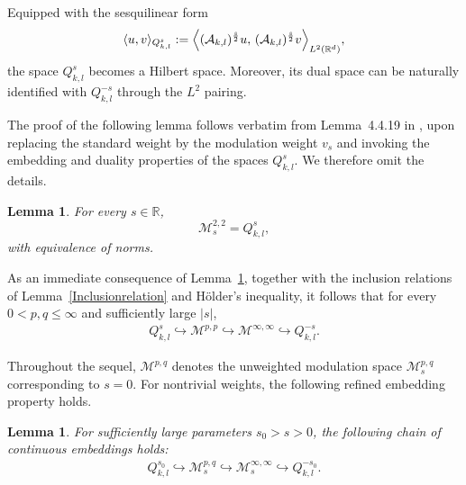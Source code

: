 \documentclass[12pt,reqno,a4paper]{amsart}
\numberwithin{equation}{section}
\theoremstyle{plain}
\newtheorem{lemma}[theorem]{Lemma}
\theoremstyle{definition}
\theoremstyle{remark}
\begin{document}
Equipped with the sesquilinear form
\begin{align*}
\langle u,v\rangle_{Q^{s}_{k,l}}
:=
\Bigl\langle
(\mathcal{A}_{k,l})^{\frac{s}{2}}u,\,
(\mathcal{A}_{k,l})^{\frac{s}{2}}v
\Bigr\rangle_{L^{2}(\mathbb{R}^{d})},
\end{align*}
the space $Q^{s}_{k,l}$ becomes a Hilbert space. Moreover, its dual space can be naturally identified with $Q^{-s}_{k,l}$ through the $L^{2}$ pairing.

The proof of the following lemma follows verbatim from Lemma~4.4.19 in \cite{MR4201879}, upon replacing the standard weight by the modulation weight $v_s$ and invoking the embedding and duality properties of the spaces $Q^{s}_{k,l}$. We therefore omit the details.

\begin{lemma}
\label{anharmonicsobolevspace}
For every $s\in\mathbb{R}$,
\[
\mathcal{M}^{2,2}_{s}
=
Q^{s}_{k,l},
\]
with equivalence of norms.
\end{lemma}

As an immediate consequence of Lemma~\ref{anharmonicsobolevspace}, together with the inclusion relations of Lemma~\ref{Inclusionrelation} and Hölder's inequality, it follows that for every $0<p,q\leq \infty$ and sufficiently large $|s|$,
\begin{align*}
Q^{s}_{k,l}
\hookrightarrow
\mathcal{M}^{p,p}
\hookrightarrow
\mathcal{M}^{\infty,\infty}
\hookrightarrow
Q^{-s}_{k,l}.
\end{align*}

Throughout the sequel, $\mathcal{M}^{p,q}$ denotes the unweighted modulation space $\mathcal{M}^{p,q}_{s}$ corresponding to $s=0$. For nontrivial weights, the following refined embedding property holds.

\begin{lemma}
For sufficiently large parameters $s_{0}>s>0$, the following chain of continuous embeddings holds:
\begin{align}
\label{chain1}
Q^{s_{0}}_{k,l}
\hookrightarrow
\mathcal{M}^{p,q}_{s}
\hookrightarrow
\mathcal{M}^{\infty,\infty}_{s}
\hookrightarrow
Q^{-s_{0}}_{k,l}.
\end{align}
\end{lemma}
\end{document}
